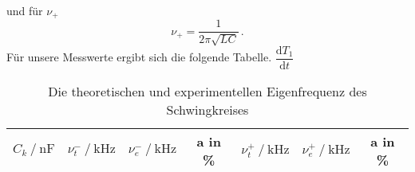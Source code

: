 und für $\nu_+$ 
\begin{equation*}
    \nu_+     =\dfrac{1}{2\pi \sqrt{LC}}\,.
\end{equation*}
Für unsere Messwerte ergibt sich die folgende Tabelle.
{$\dfrac{\text{d}T_1}{\text{d}t}$}
\begin{table}[H]
    \centering
    \begin{tabular}{S S S S S S S}
      \toprule
        {$C_k \mathbin{/} \unit{\nano\farad}$} & {$\nu^-_t \mathbin{/} \unit{\kilo\hertz}$} & {$\nu^-_e \mathbin{/} \unit{\kilo\hertz}$} & {a in \%} & {$\nu^+_t \mathbin{/} \unit{\kilo\hertz}$} & {$\nu^+_e \mathbin{/} \unit{\kilo\hertz}$} & {a in \%}\\
      \midrule
      


      \bottomrule
    \end{tabular}
    \caption{Die theoretischen und experimentellen Eigenfrequenz des Schwingkreises}
  \end{table}